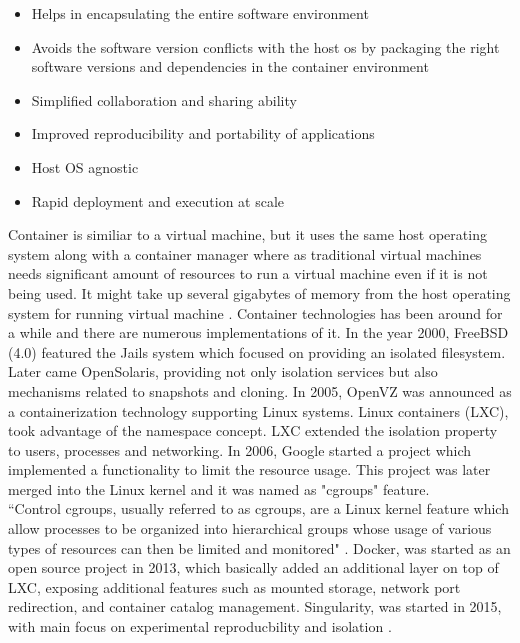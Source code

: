\begin{itemize}
  \item Helps in encapsulating the entire software environment
  \item Avoids the software version conflicts with the host os by packaging the right software versions and dependencies in the container environment
  \item Simplified collaboration and sharing ability
  \item Improved reproducibility and portability of applications
  \item Host OS agnostic
  \item Rapid deployment and execution at scale  
\end{itemize}

Container is similiar to a virtual machine, but it uses the same host operating system along with a container manager where as traditional virtual machines needs significant amount of resources to run a virtual machine even if it is not being used. It might take up several gigabytes of memory from the host operating system for running virtual machine \cite{DBLP:journals/corr/HaleLRW16}. Container technologies has been around for a while and there are numerous implementations of it. In the year 2000, FreeBSD (4.0) featured the Jails system which focused on providing an isolated filesystem. Later came OpenSolaris, providing not only isolation services but also mechanisms related to snapshots and cloning. In 2005, OpenVZ was announced as a containerization technology supporting Linux systems. Linux containers (LXC), took advantage of the namespace concept. LXC extended the isolation property to users, processes and networking. In 2006, Google started a project which implemented a functionality to limit the resource usage. This project was later merged into the Linux kernel and it was named as "cgroups" feature. \\
 
``Control cgroups, usually referred to as cgroups, are a Linux kernel feature which allow processes to be organized into hierarchical groups whose usage of various types of resources can then be limited and monitored" \cite{cgroups}. Docker, was started as an open source project in 2013, which basically added an additional layer on top of LXC, exposing additional features such as mounted storage, network port redirection, and container catalog management. Singularity, was started in 2015, with main focus on experimental reproducbility and isolation \cite{Xavier:2013:PEC:2497369.2497577}.\\ 

